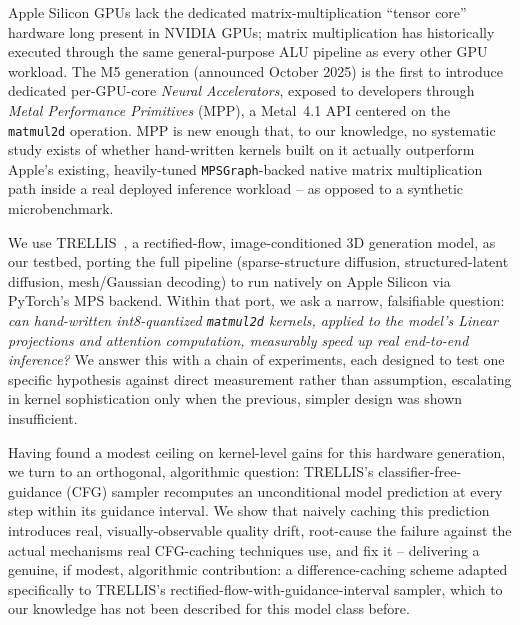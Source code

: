 \documentclass[11pt]{article}
\newcommand{\code}[1]{\texttt{#1}}
\begin{document}
Apple Silicon GPUs lack the dedicated matrix-multiplication ``tensor core'' hardware long present
in NVIDIA GPUs; matrix multiplication has historically executed through the same general-purpose
ALU pipeline as every other GPU workload. The M5 generation (announced October 2025) is the first
to introduce dedicated per-GPU-core \emph{Neural Accelerators}, exposed to developers through
\emph{Metal Performance Primitives} (MPP), a Metal~4.1 API centered on the \code{matmul2d}
operation. MPP is new enough that, to our knowledge, no systematic study exists of whether
hand-written kernels built on it actually outperform Apple's existing, heavily-tuned
\code{MPSGraph}-backed native matrix multiplication path inside a real deployed inference
workload -- as opposed to a synthetic microbenchmark.

We use TRELLIS~\cite{trellis2024}, a rectified-flow, image-conditioned 3D generation model, as our
testbed, porting the full pipeline (sparse-structure diffusion, structured-latent diffusion,
mesh/Gaussian decoding) to run natively on Apple Silicon via PyTorch's MPS backend. Within that
port, we ask a narrow, falsifiable question: \emph{can hand-written int8-quantized \code{matmul2d}
kernels, applied to the model's Linear projections and attention computation, measurably speed up
real end-to-end inference?} We answer this with a chain of experiments, each designed to test one
specific hypothesis against direct measurement rather than assumption, escalating in kernel
sophistication only when the previous, simpler design was shown insufficient.

Having found a modest ceiling on kernel-level gains for this hardware generation, we turn to an
orthogonal, algorithmic question: TRELLIS's classifier-free-guidance (CFG) sampler recomputes an
unconditional model prediction at every step within its guidance interval. We show that naively
caching this prediction introduces real, visually-observable quality drift, root-cause the failure
against the actual mechanisms real CFG-caching techniques use, and fix it -- delivering a genuine,
if modest, algorithmic contribution: a difference-caching scheme adapted specifically to
TRELLIS's rectified-flow-with-guidance-interval sampler, which to our knowledge has not been
described for this model class before.
\end{document}
